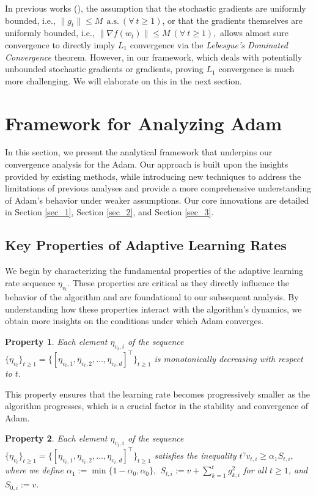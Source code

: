 \documentclass{article} %
\newtheorem{property}{\textbf{Property}}
\begin{document}
In previous works (\cite{he2023convergence,xiao2024adam}), the assumption that the stochastic gradients are uniformly bounded, i.e., $\|g_{t}\|\le M\ \ \text{a.s.}\ (\forall\ t\ge 1)$, or that the gradients themselves are uniformly bounded, i.e., $\|\nabla f(w_{t})\|\le M\ (\forall\ t\ge 1),$ allows almost sure convergence to directly imply $L_1$ convergence via the \emph{Lebesgue's Dominated Convergence} theorem. However, in our framework, which deals with potentially unbounded stochastic gradients or gradients, proving $L_1$ convergence is much more challenging. We will elaborate on this in the next section.

\section{Framework for Analyzing Adam}

In this section, we present the analytical framework that underpins our convergence analysis for the Adam. Our approach is built upon the insights provided by existing methods, while introducing new techniques to address the limitations of previous analyses and provide a more comprehensive understanding of Adam's behavior under weaker assumptions. Our core innovations are detailed in Section \ref{sec_1}, Section \ref{sec_2}, and Section \ref{sec_3}.


\subsection{Key Properties of Adaptive Learning Rates}
We begin by characterizing the fundamental properties of the adaptive learning rate sequence \(\eta_{v_{t}}\). These properties are critical as they directly influence the behavior of the algorithm and are foundational to our subsequent analysis. By understanding how these properties interact with the algorithm's dynamics, we obtain more insights on the conditions under which Adam converges.
\begin{property}\label{property_0}
Each element \(\eta_{v_{t},i}\) of the sequence \(\{\eta_{v_{t}}\}_{t\ge 1} = \{[\eta_{v_{t},1}, \eta_{v_{t},2}, \ldots, \eta_{v_{t},d}]^{\top}\}_{t\ge 1}\) is monotonically decreasing with respect to \( t \).
\end{property}
This property ensures that the learning rate becomes progressively smaller as the algorithm progresses, which is a crucial factor in the stability and convergence of Adam.
\begin{property}\label{property_1}
Each element \(\eta_{v_{t},i}\) of the sequence \(\{\eta_{v_{t}}\}_{t\ge 1} = \{[\eta_{v_{t},1}, \eta_{v_{t},2}, \ldots, \eta_{v_{t},d}]^{\top}\}_{t\ge 1}\) satisfies the inequality \(t^{\gamma}v_{t,i}\ge \alpha_{1}S_{t,i},\) where we define \(\alpha_{1}:=\min\{1-\alpha_{0},\alpha_{0}\},\) \(S_{t,i}:=v+\sum_{k=1}^{t}g_{k,i}^{2}\) for all \( t\ge 1 \), and \(S_{0,i}:=v.\)
\end{property}
\end{document}

